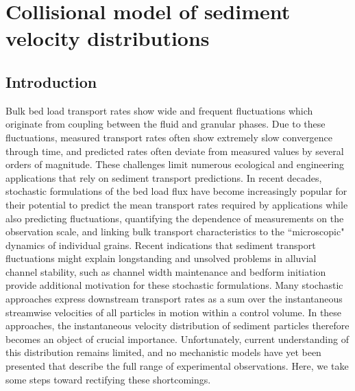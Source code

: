 
\chapter{Collisional model of sediment velocity distributions}
\label{ch:langevin}
\section{Introduction}

Bulk bed load transport rates show wide and frequent fluctuations which originate from coupling between the fluid and granular phases.
Due to these fluctuations, measured transport rates often show extremely slow convergence through time, and predicted rates often deviate from measured values by several orders of magnitude.
These challenges limit numerous ecological and engineering applications that rely on sediment transport predictions.
In recent decades, stochastic formulations of the bed load flux have become increasingly popular for their potential to predict the mean transport rates required by applications while also predicting fluctuations, quantifying the dependence of measurements on the observation scale, and linking bulk transport characteristics to the ``microscopic" dynamics of individual grains.
Recent indications that sediment transport fluctuations might explain longstanding and unsolved problems in alluvial channel stability, such as channel width maintenance \citep{Boltzman, Lajeunesse2020} and bedform initiation \citep{Ancey2014,Bohorquez2016} provide additional motivation for these stochastic formulations.
Many stochastic approaches express downstream transport rates as a sum over the instantaneous streamwise velocities of all particles in motion within a control volume.
In these approaches, the instantaneous velocity distribution of sediment particles therefore becomes an object of crucial importance.
Unfortunately, current understanding of this distribution remains limited, and no mechanistic models have yet been presented that describe the full range of experimental observations. Here, we take some steps toward rectifying these shortcomings.

